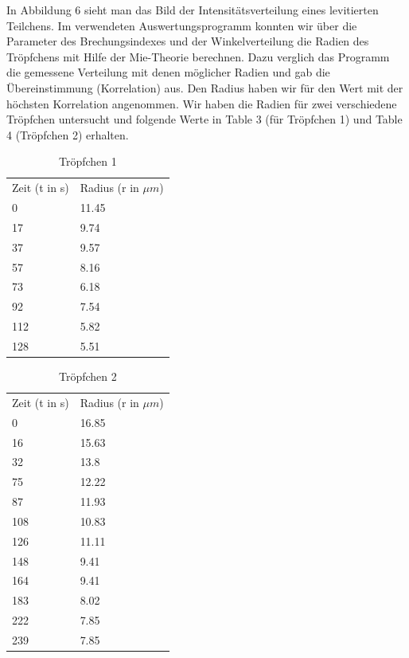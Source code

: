 \documentclass[10pt,a4paper]{article}
\begin{document}
In Abbildung 6 sieht man das Bild der Intensitätsverteilung eines levitierten Teilchens. Im verwendeten Auswertungsprogramm konnten wir über die Parameter des Brechungsindexes und der Winkelverteilung die Radien des Tröpfchens mit Hilfe der Mie-Theorie berechnen. Dazu verglich das Programm die gemessene Verteilung mit denen möglicher Radien und gab die Übereinstimmung (Korrelation) aus. Den Radius haben wir für den Wert mit der höchsten Korrelation angenommen. Wir haben die Radien für zwei verschiedene Tröpfchen untersucht und folgende Werte in Table 3 (für Tröpfchen 1) und Table 4 (Tröpfchen 2) erhalten.\\

\begin{table}[h!]
	\centering
	\caption{Tröpfchen 1}
	\label{my-label}
	\begin{tabular}{ll}
		Zeit (t in s) & Radius (r in $\mu m$) \\
		0             & 11.45                \\
		17            & 9.74                 \\
		37            & 9.57                 \\
		57            & 8.16                 \\
		73            & 6.18                 \\
		92            & 7.54                 \\
		112           & 5.82                 \\
		128           & 5.51                
	\end{tabular}
\end{table}
\begin{table}[h!]
	\centering
	\caption{Tröpfchen 2}
	\label{my-label}
	\begin{tabular}{ll}
		Zeit (t in s) & Radius (r in $\mu m$) \\
		0             & 16.85                \\
		16            & 15.63                \\
		32            & 13.8                 \\
		75            & 12.22                \\
		87            & 11.93                \\
		108           & 10.83                \\
		126           & 11.11                \\
		148           & 9.41                 \\
		164           & 9.41                 \\
		183           & 8.02                 \\
		222           & 7.85                 \\
		239           & 7.85                
	\end{tabular}
\end{table}
\end{document}
